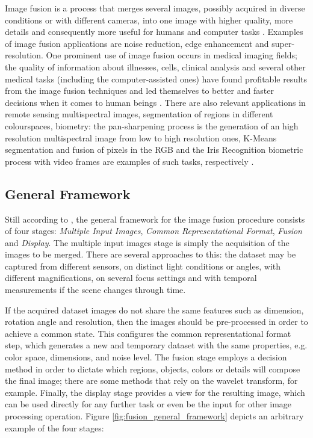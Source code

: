 Image fusion is a process that merges several images, possibly acquired in diverse conditions or with different cameras, into one image with higher quality, more details and consequently more useful for humans and computer tasks \cite{mitchell2010image}. Examples of image fusion applications are noise reduction, edge enhancement and super-resolution. One prominent use of image fusion occurs in medical imaging fields; the quality of information about illnesses, cells, clinical analysis and several other medical tasks (including the computer-assisted ones) have found profitable results from the image fusion techniques and led themselves to better and faster decisions when it comes to human beings \cite{james2014medical}. There are also relevant applications in remote sensing multispectral images, segmentation of regions in different colourspaces, biometry: the pan-sharpening process is the generation of an high resolution multispectral image from low to high resolution ones, K-Means segmentation and fusion of pixels in the RGB and the Iris Recognition biometric process with video frames are examples of such tasks, respectively \cite{mitchell2010image}.

\subsection{General Framework}

Still according to , the general framework for the image fusion procedure consists of four stages: \emph{Multiple Input Images}, \emph{Common Representational Format}, \emph{Fusion} and \emph{Display}.
The multiple input images stage is simply the acquisition of the images to be merged. There are several approaches to this: the dataset may be captured from different sensors, on distinct light conditions or angles, with different magnifications, on several focus settings and with temporal measurements if the scene changes through time.

If the acquired dataset images do not share the same features such as dimension, rotation angle and resolution, then the images should be pre-processed in order to achieve a common state. This configures the common representational format step, which generates a new and temporary dataset with the same properties, e.g. color space, dimensions, and noise level. The fusion stage employs a decision method in order to dictate which regions, objects, colors or details will compose the final image; there are some methods that rely on the wavelet transform, for example. Finally, the display stage provides a view for the resulting image, which can be used directly for any further task or even be the input for other image processing operation. Figure \ref{fig:fusion_general_framework} depicts an arbitrary example of the four stages:

